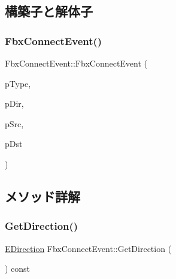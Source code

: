 \subsection{構築子と解体子}
\mbox{\label{class_fbx_connect_event_a26c1e445ded5965f2e3a09643ab9b679}} 
\subsubsection{\texorpdfstring{Fbx\+Connect\+Event()}{FbxConnectEvent()}}
{\footnotesize\ttfamily Fbx\+Connect\+Event\+::\+Fbx\+Connect\+Event (\begin{DoxyParamCaption}\item[{\hyperlink{class_fbx_connect_event_aa5471711f7e440a5a236ed06b08bf1d7}{E\+Type}}]{p\+Type,  }\item[{\hyperlink{class_fbx_connect_event_a74f6cfad7f026059654d3bc6a582a78e}{E\+Direction}}]{p\+Dir,  }\item[{\hyperlink{class_fbx_property}{Fbx\+Property} $\ast$}]{p\+Src,  }\item[{\hyperlink{class_fbx_property}{Fbx\+Property} $\ast$}]{p\+Dst }\end{DoxyParamCaption})}



\subsection{メソッド詳解}
\mbox{\label{class_fbx_connect_event_a0abc492bbba44390dbbba9d7dc9e0726}} 
\subsubsection{\texorpdfstring{Get\+Direction()}{GetDirection()}}
{\footnotesize\ttfamily \hyperlink{class_fbx_connect_event_a74f6cfad7f026059654d3bc6a582a78e}{E\+Direction} Fbx\+Connect\+Event\+::\+Get\+Direction (\begin{DoxyParamCaption}{ }\end{DoxyParamCaption}) const}

\mbox{\label{class_fbx_connect_event_a2b6176e2e3ce7e308909971b7534fd38}} 
